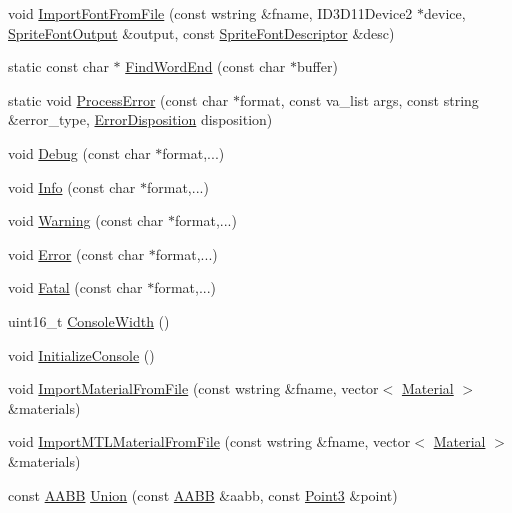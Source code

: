 \begin{DoxyCompactItemize}
\item 
void \hyperlink{namespacemage_a23fecd103cda79e7c9fd5cf372ae5e9f}{Import\+Font\+From\+File} (const wstring \&fname, I\+D3\+D11\+Device2 $\ast$device, \hyperlink{structmage_1_1_sprite_font_output}{Sprite\+Font\+Output} \&output, const \hyperlink{structmage_1_1_sprite_font_descriptor}{Sprite\+Font\+Descriptor} \&desc)
\item 
static const char $\ast$ \hyperlink{namespacemage_a81ebde51f9da00dd6fad364a2c5017cb}{Find\+Word\+End} (const char $\ast$buffer)
\item 
static void \hyperlink{namespacemage_ab248f74af47acacc1306e875fb19a9ce}{Process\+Error} (const char $\ast$format, const va\+\_\+list args, const string \&error\+\_\+type, \hyperlink{namespacemage_a7146b3c3db53179eeb32bf4d51934715}{Error\+Disposition} disposition)
\item 
void \hyperlink{namespacemage_a1bcf1f0301e170105908eee5b5c46830}{Debug} (const char $\ast$format,...)
\item 
void \hyperlink{namespacemage_add6aa5f13960ce07b20f48d273956a91}{Info} (const char $\ast$format,...)
\item 
void \hyperlink{namespacemage_a0eccd8065c75d5f2bf86b48a5be3bfe5}{Warning} (const char $\ast$format,...)
\item 
void \hyperlink{namespacemage_a52a7fe8c9ce39afd9e0b0299373db0fa}{Error} (const char $\ast$format,...)
\item 
void \hyperlink{namespacemage_aefd40c91591a8e0423e4222b4a5e6249}{Fatal} (const char $\ast$format,...)
\item 
uint16\+\_\+t \hyperlink{namespacemage_a2988e0e46e373691a189ea97135f1ed1}{Console\+Width} ()
\item 
void \hyperlink{namespacemage_a587146c8cbeed655be16ddff8435c05c}{Initialize\+Console} ()
\item 
void \hyperlink{namespacemage_a1ec5e042dc875b6f9ec5e2f15c7d6320}{Import\+Material\+From\+File} (const wstring \&fname, vector$<$ \hyperlink{structmage_1_1_material}{Material} $>$ \&materials)
\item 
void \hyperlink{namespacemage_af823dc7245aa79b1e789ac8f58d766d2}{Import\+M\+T\+L\+Material\+From\+File} (const wstring \&fname, vector$<$ \hyperlink{structmage_1_1_material}{Material} $>$ \&materials)
\item 
const \hyperlink{structmage_1_1_a_a_b_b}{A\+A\+BB} \hyperlink{namespacemage_a4d27bf7b1b0d30b747cdec1326e80907}{Union} (const \hyperlink{structmage_1_1_a_a_b_b}{A\+A\+BB} \&aabb, const \hyperlink{structmage_1_1_point3}{Point3} \&point)

\end{DoxyCompactItemize}
